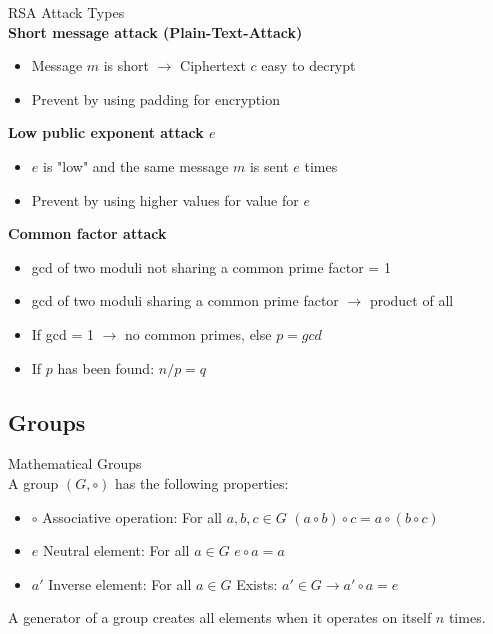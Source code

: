 \begin{definition}{RSA Attack Types}\\
    \textbf{Short message attack (Plain-Text-Attack)}
    \begin{itemize}
        \item Message $m$ is short $\rightarrow$ Ciphertext $c$ easy to decrypt
        \item Prevent by using padding for encryption
    \end{itemize}
    
    \textbf{Low public exponent attack $e$}
    \begin{itemize}
        \item $e$ is "low" and the same message $m$ is sent $e$ times
        \item Prevent by using higher values for value for $e$
    \end{itemize}
    
    \textbf{Common factor attack}
    \begin{itemize}
        \item gcd of two moduli not sharing a common prime factor = 1
        \item gcd of two moduli sharing a common prime factor $\rightarrow$ product of all
        \item If gcd = 1 $\rightarrow$ no common primes, else $p = gcd$
        \item If $p$ has been found: $n/p = q$
    \end{itemize}
\end{definition}

\subsection{Groups}

\begin{definition}{Mathematical Groups}\\
    A group $(G, \circ)$ has the following properties:
    \begin{itemize}
        \item $\circ$ Associative operation: For all $a, b, c \in G$ $(a \circ b) \circ c = a \circ (b \circ c)$
        \item $e$ Neutral element: For all $a \in G$ $e \circ a = a$
        \item $a'$ Inverse element: For all $a \in G$ Exists: $a' \in G \rightarrow a' \circ a = e$
    \end{itemize}
    
    A generator of a group creates all elements when it operates on itself $n$ times.
\end{definition}

